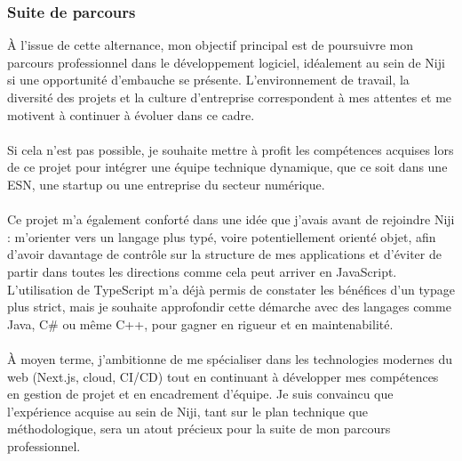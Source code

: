 \documentclass[12pt]{article}
\begin{document}
\subsubsection{Suite de parcours}
À l’issue de cette alternance, mon objectif principal est de poursuivre mon parcours professionnel dans le développement logiciel, idéalement au sein de Niji si une opportunité d’embauche se présente. L’environnement de travail, la diversité des projets et la culture d’entreprise correspondent à mes attentes et me motivent à continuer à évoluer dans ce cadre.
\\\\
Si cela n’est pas possible, je souhaite mettre à profit les compétences acquises lors de ce projet pour intégrer une équipe technique dynamique, que ce soit dans une ESN, une startup ou une entreprise du secteur numérique.
\\\\
Ce projet m’a également conforté dans une idée que j’avais avant de rejoindre Niji : m’orienter vers un langage plus typé, voire potentiellement orienté objet, afin d’avoir davantage de contrôle sur la structure de mes applications et d’éviter de partir dans toutes les directions comme cela peut arriver en JavaScript. L’utilisation de TypeScript m’a déjà permis de constater les bénéfices d’un typage plus strict, mais je souhaite approfondir cette démarche avec des langages comme Java, C\# ou même C++, pour gagner en rigueur et en maintenabilité.
\\\\
À moyen terme, j’ambitionne de me spécialiser dans les technologies modernes du web (Next.js, cloud, CI/CD) tout en continuant à développer mes compétences en gestion de projet et en encadrement d’équipe. Je suis convaincu que l’expérience acquise au sein de Niji, tant sur le plan technique que méthodologique, sera un atout précieux pour la suite de mon parcours professionnel.
\end{document}
